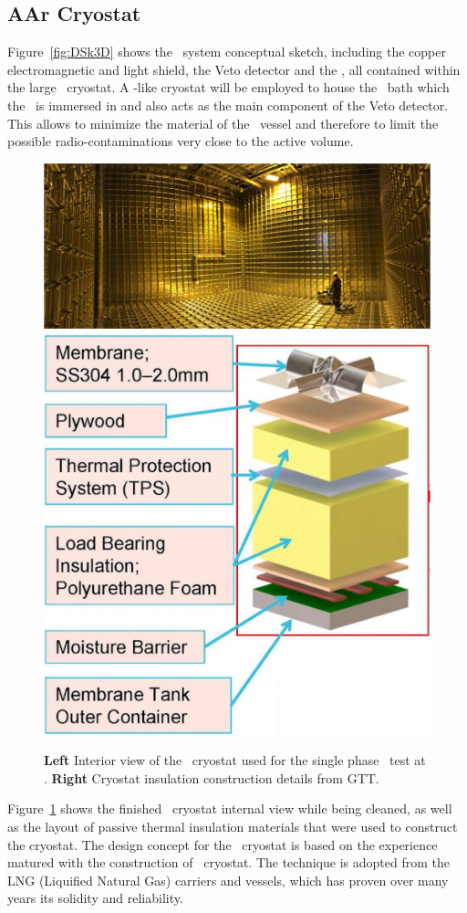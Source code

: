 \subsection{AAr Cryostat}
\label{sec:Cryostat}

Figure~\ref{fig:DSk3D} shows the \DSk\ system conceptual sketch, including the copper electromagnetic and light shield, the Veto detector and the \LArTPC, all contained within the large \AAr\ cryostat.  A \pDUNE-like cryostat will be employed to house the \LAr\ bath which the \TPC\ is immersed in and also acts as the main component of the Veto detector. This allows to minimize the material of the \TPC\ vessel and therefore to limit the possible radio-contaminations very close to the active volume.  

\begin{figure}[!t]
\includegraphics[height=0.30\textwidth]{./Figures/ProtoDUNE-Cryostat-Inner-Photo.jpg}
\includegraphics[height=0.30\textwidth]{./Figures/Membrane-concept.jpg}
\caption[Details of the \AAr\ cryostat]{{\bf Left} Interior view of the \pDUNE\ cryostat used for the single phase \LArTPC\ test at \CERN.  {\bf Right} Cryostat insulation construction details from GTT.}
\label{fig:Cryostat}
\end{figure}

Figure~\ref{fig:Cryostat} shows the finished \pDUNE\ cryostat internal view while being cleaned, as well as the layout of passive thermal insulation materials that were used to construct the cryostat.  The design concept for the \DSks\ cryostat is based on the experience matured with the construction of \pDUNE\ cryostat. The technique is adopted from the LNG (Liquified Natural Gas) carriers and vessels, which has proven over many years its solidity and reliability. 


